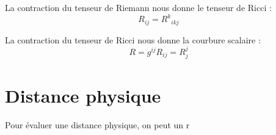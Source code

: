 \documentclass[10pt, a4paper]{report}
\numberwithin{equation}{subsection}
\begin{document}
La contraction du tenseur de Riemann nous donne le tenseur de Ricci : 
\begin{equation}
\boxed{R_{ij} = {R^k}_{ikj}}
\end{equation}

La contraction du tenseur de Ricci nous donne la courbure scalaire : 
\begin{equation}
\boxed{R  = g^{ij}R_{ij} = R^j_j}
\end{equation}

\section{Distance physique}
Pour évaluer une distance physique, on peut un r
\end{document}
